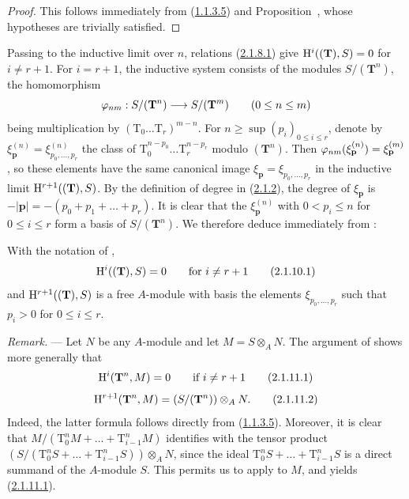 \begin{proof}
This follows immediately from (\hyperref[III.1.1.3.5]{1.1.3.5}) and Proposition~, whose hypotheses are trivially satisfied.
\end{proof}

\begin{env}[2.1.9]
\label{III.2.1.9}
Passing to the inductive limit over $n$, relations (\hyperref[III.2.1.8.1]{2.1.8.1}) give $\mathrm{H}^i((\mathbf{T}),S)=0$ for $i\neq r+1$.
For $i=r+1$, the inductive system consists of the modules $S/(\mathbf{T}^n)$, the homomorphism
\[
  \varphi_{nm}:S/(\mathbf{T}^n)\longrightarrow S/(\mathbf{T}^m)
  \qquad (0\leq n\leq m)
\]
being multiplication by $(\mathrm{T}_0\ldots\mathrm{T}_r)^{m-n}$.
For $n\geq\sup(p_i)_{0\leq i\leq r}$, denote by $\xi_{\mathbf{p}}^{(n)}=\xi_{p_0,\dots,p_r}^{(n)}$ the class of $\mathrm{T}_0^{n-p_0}\ldots\mathrm{T}_r^{n-p_r}$ modulo $(\mathbf{T}^n)$.
Then $\varphi_{nm}(\xi_{\mathbf{p}}^{(n)})=\xi_{\mathbf{p}}^{(m)}$, so these elements have the same canonical image $\xi_{\mathbf{p}}=\xi_{p_0,\dots,p_r}$ in the inductive limit $\mathrm{H}^{r+1}((\mathbf{T}),S)$.
By the definition of degree in (\hyperref[III.2.1.2]{2.1.2}), the degree of $\xi_{\mathbf{p}}$ is $-|\mathbf{p}|=-(p_0+p_1+\ldots+p_r)$.
It is clear that the $\xi_{\mathbf{p}}^{(n)}$ with $0<p_i\leq n$ for $0\leq i\leq r$ form a basis of $S/(\mathbf{T}^n)$.
We therefore deduce immediately from :
\end{env}

\begin{corollary}[2.1.10]
\label{III.2.1.10}
With the notation of ,
\[
\label{III.2.1.10.1}
  \mathrm{H}^i((\mathbf{T}),S)=0
  \qquad\text{for }i\neq r+1
  \tag{2.1.10.1}
\]
and $\mathrm{H}^{r+1}((\mathbf{T}),S)$ is a free $A$-module with basis the elements $\xi_{p_0,\dots,p_r}$ such that $p_i>0$ for $0\leq i\leq r$.
\end{corollary}

\begin{env}[2.1.11]
\label{III.2.1.11}
\emph{Remark.} ---
Let $N$ be any $A$-module and let $M=S\otimes_A N$.
The argument of  shows more generally that
\[
\label{III.2.1.11.1}
  \mathrm{H}^i(\mathbf{T}^n,M)=0
  \qquad\text{if }i\neq r+1
  \tag{2.1.11.1}
\]
\[
\label{III.2.1.11.2}
  \mathrm{H}^{r+1}(\mathbf{T}^n,M)=(S/(\mathbf{T}^n))\otimes_A N.
  \tag{2.1.11.2}
\]
Indeed, the latter formula follows directly from (\hyperref[III.1.1.3.5]{1.1.3.5}).
Moreover, it is clear that
$M/(\mathrm{T}_0^nM+\ldots+\mathrm{T}_{i-1}^nM)$
identifies with the tensor product
$(S/(\mathrm{T}_0^nS+\ldots+\mathrm{T}_{i-1}^nS))\otimes_A N$,
since the ideal $\mathrm{T}_0^nS+\ldots+\mathrm{T}_{i-1}^nS$ is a direct summand of the $A$-module $S$.
This permits us to apply  to $M$, and yields (\hyperref[III.2.1.11.1]{2.1.11.1}).
\end{env}

